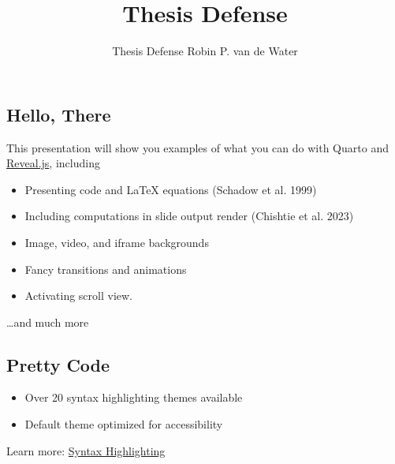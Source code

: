 \documentclass[
  letterpaper,
  DIV=11,
  numbers=noendperiod]{scrartcl}
\title{Thesis Defense}
\subtitle{Thesis Defense Robin P. van de Water}
\author{}
\date{}
\newenvironment{Shaded}{\begin{snugshade}}{\end{snugshade}}
\newcommand{\CommentTok}[1]{\textcolor[rgb]{0.37,0.37,0.37}{#1}}
\newcommand{\ControlFlowTok}[1]{\textcolor[rgb]{0.00,0.23,0.31}{\textbf{#1}}}
\newcommand{\FunctionTok}[1]{\textcolor[rgb]{0.28,0.35,0.67}{#1}}
\newcommand{\NormalTok}[1]{\textcolor[rgb]{0.00,0.23,0.31}{#1}}
\newcommand{\OtherTok}[1]{\textcolor[rgb]{0.00,0.23,0.31}{#1}}
\newcommand{\SpecialCharTok}[1]{\textcolor[rgb]{0.37,0.37,0.37}{#1}}
\providecommand{\tightlist}{%
  \setlength{\itemsep}{0pt}\setlength{\parskip}{0pt}}
\begin{document}
\maketitle


\subsection{Hello, There}\label{hello-there}

This presentation will show you examples of what you can do with Quarto
and \href{https://revealjs.com}{Reveal.js}, including

\begin{itemize}
\tightlist
\item
  Presenting code and LaTeX equations (Schadow et al. 1999)
\item
  Including computations in slide output render (Chishtie et al. 2023)
\item
  Image, video, and iframe backgrounds
\item
  Fancy transitions and animations
\item
  Activating scroll view.
\end{itemize}

\ldots and much more

\subsection{Pretty Code}\label{pretty-code}

\begin{itemize}
\tightlist
\item
  Over 20 syntax highlighting themes available
\item
  Default theme optimized for accessibility
\end{itemize}

\begin{Shaded}
\end{Shaded}

Learn more:
\href{https://?meta:prerelease-subdomainquarto.org/docs/output-formats/html-code.html\#highlighting}{Syntax
Highlighting}
\end{document}
